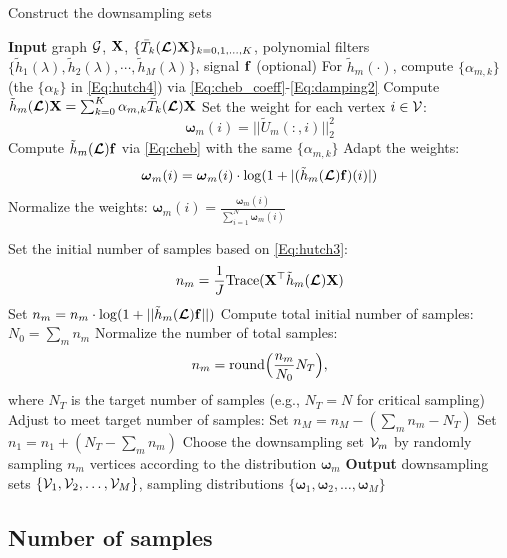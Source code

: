 \documentclass[journal, 10pt]{IEEEtran}
\begin{document}
\begin{algorithm}[tb]
\caption{Construct the downsampling sets}
\begin{algorithmic}
\State \textbf{Input} graph ${\mathcal{G}}$,  ${\bf X}$, $\{\bar{T}_k(\boldsymbol{\mathcal{L}}){\bf X}\}_{k=0,1,\ldots,K}$, polynomial filters $\{ \tilde{h}_1(\lambda), \tilde{h}_2(\lambda), \cdots, \tilde{h}_M(\lambda)\}$, signal ${\bf f}$ (optional)
\State For $\tilde{h}_m(\cdot)$, compute $\{\alpha_{m,k}\}$ (the $\{\alpha_k\}$ in \eqref{Eq:hutch4}) via \eqref{Eq:cheb_coeff}-\eqref{Eq:damping2}
\State Compute $\tilde{h}_m(\boldsymbol{\mathcal{L}}){\bf X}=\sum_{k=0}^K \alpha_{m,k}\bar{T}_k(\boldsymbol{\mathcal{L}}){\bf X}$
\State Set the weight for each vertex $i \in {\mathcal{V}}$: 
$${\boldsymbol \omega}_m(i) = ||\tilde{U}_m(:,i)||^2_2$$
\State Compute $\tilde{h}_m(\boldsymbol{\mathcal{L}}){\bf f}$ via \eqref{Eq:cheb} with the same $\{\alpha_{m,k}\}$
\State Adapt the weights: $${\boldsymbol \omega}_m(i) = {\boldsymbol \omega}_m(i) \cdot \log(1+|(\tilde{h}_m(\boldsymbol{\mathcal{L}}){\bf f})(i)|)$$
\EndIf
\State Normalize the weights: ${\boldsymbol \omega}_m(i)=\frac{{\boldsymbol \omega}_m(i)}{\sum_{i=1}^N {\boldsymbol \omega}_m(i)}$

\State Set the initial number of samples based on \eqref{Eq:hutch3}: 
$$n_m = \frac{1}{J} \mathrm{Trace}({\bf X}^\top \tilde{h}_m(\boldsymbol{\mathcal{L}})\bf{X})$$
\EndFor
{}
\State Set $n_m=n_m \cdot \log(1+||\tilde{h}_m(\boldsymbol{\mathcal{L}}){\bf f}||)$
\EndFor
\EndIf
\State Compute total initial number of samples: $N_0 = \sum_m n_m$
\State Normalize the number of total samples: $$n_m = \hbox{round}\Bigl(\frac{n_m}{N_0}N_T\Bigr),$$
where $N_T$ is the target number of samples (e.g., $N_T=N$ for critical sampling)
\EndFor
\State Adjust to meet target number of samples:  
\State Set $n_M = n_M - (\sum_m n_m -N_T)$
\State Set $n_1 = n_1 + (N_T-\sum_m n_m)$
\EndIf
\State Choose the downsampling set ${\mathcal{V}}_m$ by randomly sampling $n_m$ vertices according to the distribution ${\boldsymbol \omega}_m$
\EndFor
\State \textbf{Output} downsampling sets $\{{\mathcal{V}}_1,{\mathcal{V}}_2, \ldots, {\mathcal{V}}_M\}$, sampling distributions $\{{\boldsymbol \omega}_1,{\boldsymbol \omega}_2,\ldots,{\boldsymbol \omega}_M\}$
\end{algorithmic}
\label{Al:downsampling}
\end{algorithm}

\subsection{Number of samples}
\end{document}
